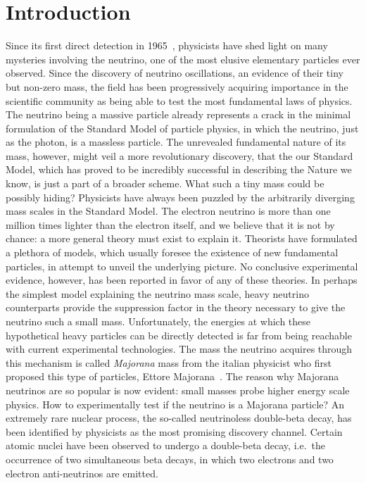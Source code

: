
\chapter{Introduction}%
\label{chap:introduction}

Since its first direct detection in 1965~\cite{Cowan1956}, physicists have shed light on
many mysteries involving the neutrino, one of the most elusive elementary particles ever
observed. Since the discovery of neutrino oscillations, an evidence of their tiny but
non-zero mass, the field has been progressively acquiring importance in the scientific
community as being able to test the most fundamental laws of physics. The neutrino being a
massive particle already represents a crack in the minimal formulation of the Standard
Model of particle physics, in which the neutrino, just as the photon, is a massless
particle. The unrevealed fundamental nature of its mass, however, might veil a more
revolutionary discovery, that the our Standard Model, which has proved to be incredibly
successful in describing the Nature we know, is just a part of a broader scheme.
\newpar
What such a tiny mass could be possibly hiding? Physicists have always been puzzled by the
arbitrarily diverging mass scales in the Standard Model. The electron neutrino is more
than one million times lighter than the electron itself, and we believe that it is not by
chance: a more general theory must exist to explain it. Theorists have formulated a
plethora of models, which usually foresee the existence of new fundamental particles, in
attempt to unveil the underlying picture. No conclusive experimental evidence, however,
has been reported in favor of any of these theories. In perhaps the simplest model
explaining the neutrino mass scale, heavy neutrino counterparts provide the suppression
factor in the theory necessary to give the neutrino such a small mass. Unfortunately, the
energies at which these hypothetical heavy particles can be directly detected is far from
being reachable with current experimental technologies. The mass the neutrino acquires
through this mechanism is called \emph{Majorana} mass from the italian physicist who first
proposed this type of particles, Ettore Majorana~\cite{Majorana1932}. The reason why
Majorana neutrinos are so popular is now evident: small masses probe higher energy scale
physics.
\newpar
How to experimentally test if the neutrino is a Majorana particle? An extremely rare
nuclear process, the so-called neutrinoless double-beta decay, has been identified by
physicists as the most promising discovery channel. Certain atomic nuclei have been
observed to undergo a double-beta decay, i.e.~the occurrence of two simultaneous beta
decays, in which two electrons and two electron anti-neutrinos are emitted.

